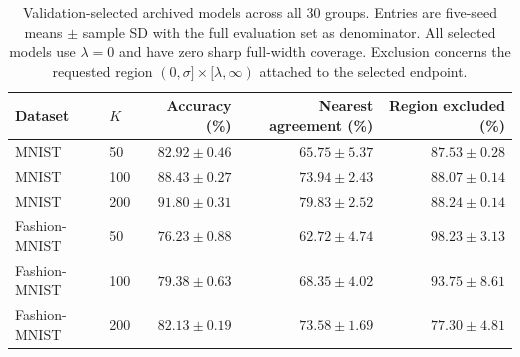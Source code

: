 \begin{table}[!htbp]
\centering\small
\caption{Validation-selected archived models across all 30 groups. Entries are five-seed means $\pm$ sample SD with the full evaluation set as denominator. All selected models use $\lambda=0$ and have zero sharp full-width coverage. Exclusion concerns the requested region $(0,\sigma]\times[\lambda,\infty)$ attached to the selected endpoint.}
\label{tab:r4-competitive}
\begin{tabular}{@{}llrrr@{}}
\toprule
Dataset & $K$ & Accuracy (\%) & Nearest agreement (\%) & Region excluded (\%)\\
\midrule
MNIST & 50 & $82.92\pm0.46$ & $65.75\pm5.37$ & $87.53\pm0.28$\\
MNIST & 100 & $88.43\pm0.27$ & $73.94\pm2.43$ & $88.07\pm0.14$\\
MNIST & 200 & $91.80\pm0.31$ & $79.83\pm2.52$ & $88.24\pm0.14$\\
Fashion-MNIST & 50 & $76.23\pm0.88$ & $62.72\pm4.74$ & $98.23\pm3.13$\\
Fashion-MNIST & 100 & $79.38\pm0.63$ & $68.35\pm4.02$ & $93.75\pm8.61$\\
Fashion-MNIST & 200 & $82.13\pm0.19$ & $73.58\pm1.69$ & $77.30\pm4.81$\\
\bottomrule
\end{tabular}
\end{table}
